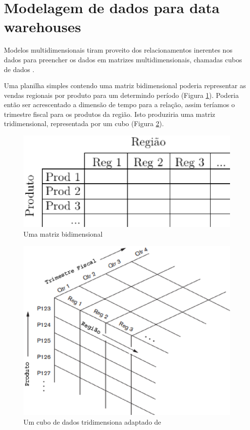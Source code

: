 \section{Modelagem de dados para data warehouses}\label{sec:modelagem-dw}

Modelos multidimensionais tiram proveito dos relacionamentos inerentes nos dados para preencher os dados em matrizes multidimensionais, chamadas cubos de dados \cite{elmasri_sistemas_2011}.

Uma planilha simples contendo uma matriz bidimensional poderia representar as vendas regionais por produto para um determindo período (Figura \ref{fig:bidimensional-dw}). Poderia então ser acrescentado a dimensão de tempo para a relação, assim teríamos o trimestre fiscal para os produtos da região. Isto produziria uma matriz tridimensional, representada por um cubo (Figura \ref{fig:cubo-dw}).


\begin{figure}[h!]
\centering
\includegraphics[keepaspectratio=false,scale=0.65]{figuras/figuras_pedro/bidimensional.eps}
\caption{Uma matriz bidimensional}
\label{fig:bidimensional-dw}
\end{figure}
\FloatBarrier


\begin{figure}[h!]
\centering
\includegraphics[keepaspectratio=false,scale=0.65]{figuras/figuras_pedro/cubo.eps}
\caption{Um cubo de dados tridimensiona adaptado de }
\label{fig:cubo-dw}
\end{figure}
\FloatBarrier

